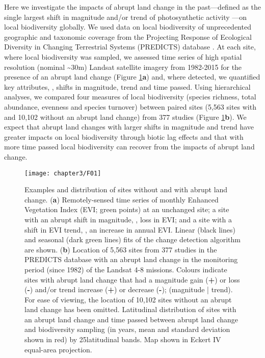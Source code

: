 Here we investigate the impacts of abrupt land change in the past—defined as the single largest shift in magnitude and/or trend of photosynthetic activity \citep{Verbesselt2010a,dejong2013,Song2018}—on local biodiversity globally. We used data on local biodiversity of unprecedented geographic and taxonomic coverage from the Projecting Response of Ecological Diversity in Changing Terrestrial Systems (PREDICTS) database \citep{Hudson2016}. At each site, where local biodiversity was sampled, we assessed time series of high spatial resolution (nominal \textasciitilde30m) Landsat satellite imagery from 1982-2015 for the presence of an abrupt land change (Figure \ref{F03_01}\textbf{a}) and, where detected, we quantified key attributes, \ie, shifts in magnitude, trend and time passed. Using hierarchical analyses, we compared four measures of local biodiversity (species richness, total abundance, evenness and species turnover) between paired sites (5,563 sites with and 10,102 without an abrupt land change) from 377 studies (Figure \ref{F03_01}\textbf{b}). We expect that abrupt land changes with larger shifts in magnitude and trend have greater impacts on local biodiversity through biotic lag effects and that with more time passed local biodiversity can recover from the impacts of abrupt land change.

\begin{figure}[!htb]
\centering
\texttt{[image: chapter3/F01]}
\caption{ Examples and distribution of sites without and with abrupt land change. (\textbf{a}) Remotely-sensed time series of monthly Enhanced Vegetation Index (EVI; green points) at an unchanged site; a site with an abrupt shift in magnitude, \ie, loss in EVI; and a site with a shift in EVI trend, \ie, an increase in annual EVI. Linear (black lines) and seasonal (dark green lines) fits of the change detection algorithm \citep{Verbesselt2010a} are shown. (\textbf{b}) Location of 5,563 sites from 377 studies in the PREDICTS database with an abrupt land change in the monitoring period (since 1982) of the Landsat 4-8 missions. Colours indicate sites with abrupt land change that had a magnitude gain (\textbf{+}) or loss (\textbf{-}) and/or trend increase (\textbf{+}) or decrease (\textbf{-}); (magnitude | trend). For ease of viewing, the location of 10,102 sites without an abrupt land change has been omitted. Latitudinal distribution of sites with an abrupt land change and time passed between abrupt land change and biodiversity sampling (in years, mean and standard deviation shown in red) by 25\textdegree  latitudinal bands. Map shown in Eckert IV equal-area projection.}
\label{F03_01}
\end{figure}
\clearpage %

